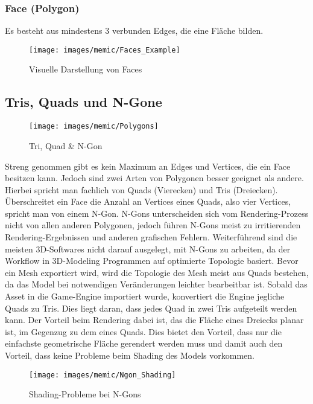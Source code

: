 \subsubsection{Face (Polygon)} 

Es besteht aus mindestens 3 verbunden Edges, die eine Fläche bilden.

\begin{figure}[H]
	\centering
	\texttt{[image: images/memic/Faces\_Example]}
	\caption{Visuelle Darstellung von Faces}
\end{figure}

\subsection{Tris, Quads und N-Gone}

\begin{figure}[H]
	\centering
	\texttt{[image: images/memic/Polygons]}
	\caption{Tri, Quad \& N-Gon}
\end{figure}

Streng genommen gibt es kein Maximum an Edges und Vertices, die ein Face besitzen kann. Jedoch sind zwei Arten von Polygonen besser geeignet als andere. Hierbei spricht man fachlich von Quads (Vierecken) und Tris (Dreiecken). Überschreitet ein Face die Anzahl an Vertices eines Quads, also vier Vertices, spricht man von einem N-Gon. N-Gons unterscheiden sich vom Rendering-Prozess nicht von allen anderen Polygonen, jedoch führen N-Gons meist zu irritierenden Rendering-Ergebnissen und anderen grafischen Fehlern. Weiterführend sind die meisten 3D-Softwares nicht darauf ausgelegt, mit N-Gons zu arbeiten, da der Workflow in 3D-Modeling Programmen auf optimierte Topologie basiert.
Bevor ein Mesh exportiert wird, wird die Topologie des Mesh meist aus Quads bestehen, da das Model bei notwendigen Veränderungen leichter bearbeitbar ist. Sobald das Asset in die Game-Engine importiert wurde, konvertiert die Engine jegliche Quads zu Tris. Dies liegt daran, dass jedes Quad in zwei Tris aufgeteilt werden kann. Der Vorteil beim Rendering dabei ist, das die Fläche eines Dreiecks planar ist, im Gegenzug zu dem eines Quads. Dies bietet den Vorteil, dass nur die einfachste geometrische Fläche gerendert werden muss und damit auch den Vorteil, dass keine Probleme beim Shading des Models vorkommen.

\begin{figure}[H]
	\centering
	\texttt{[image: images/memic/Ngon\_Shading]}
	\caption{Shading-Probleme bei N-Gons}
\end{figure}


